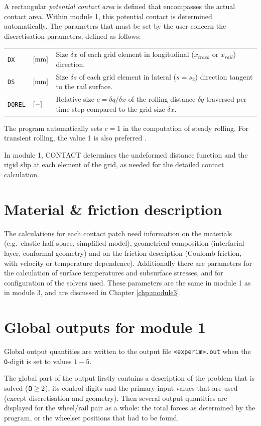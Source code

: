 \documentclass[12pt]{report}
\renewcommand{\magenta}[1]{}
\newenvironment{inputvars}{\vspace{0.4\baselineskip}%

\begin{tabular}{>{\raggedright}p{22mm}p{19mm}p{113mm}}}{
\end{tabular}

}
\newcommand{\inpvar}[3]{{\small\tt #1} & $#2$ & #3 \\[1ex]}
\begin{document}
A rectangular {\em potential contact area} is defined that encompasses the
actual contact area. Within module 1, this potential contact is determined
automatically. The parameters that must be set by the user concern the
discretisation parameters, defined as follows:
\begin{inputvars}
\inpvar{DX}{\bunit{mm}}{Size $\delta x$ of each grid element in longitudinal
        ($x_{track}$ or $x_{rail}$) direction.}
\inpvar{DS}{\bunit{mm}}{Size $\delta s$ of each grid element in lateral
        ($s = s_2$) direction tangent to the rail surface.}
\inpvar{DQREL}{\bunit{-}}{Relative size $c=\delta q/\delta x$ of the rolling
        distance $\delta q$ traversed per time step compared to the grid
        size $\delta x$.}
\end{inputvars}
The program automatically sets $c=1$ in the computation of steady rolling.
For transient rolling, the value 1 is also preferred
\cite{Vollebregt2009a-cm2009, Wekken2017a-wiggles}.

In module 1, CONTACT determines the undeformed distance function and the
rigid slip at each element of the grid, as needed for the detailed contact
calculation.
 
\section{Material \& friction description}

The calculations for each contact patch need information on the materials
(e.g.\ elastic half-space, simplified model), geometrical composition
(interfacial layer, conformal geometry) and on the friction description
(Coulomb friction, with velocity or temperature dependence). Additionally
there are parameters for the calculation of surface temperatures and
subsurface stresses, and for configuration of the solvers used. These
parameters are the same in module 1 as in module 3, and are discussed in
Chapter \ref{chp:module3}.

\section{Global outputs for module 1}
\label{sec:global_outpt1}

Global output quantities are written to the output file {\tt <experim>.out}
when the {\tt O}-digit is set to values $1-5$.

The global part of the output firstly contains a description of the problem
that is solved (${\tt O}\ge 2$), its control digits and the primary input
values that are used (except discretisation and geometry). Then several
output quantities are displayed for the wheel/rail pair as a whole: the
total forces as determined by the program, or the wheelset positions
\magenta{ and rates} that had to be found. 
\end{document}
